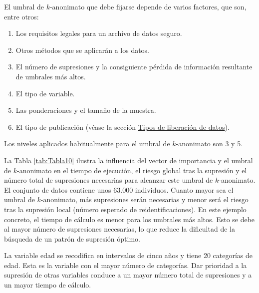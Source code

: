 \documentclass[]{book}
\providecommand{\tightlist}{%
  \setlength{\itemsep}{0pt}\setlength{\parskip}{0pt}}
\theoremstyle{definition}
\theoremstyle{definition}
\theoremstyle{definition}
\theoremstyle{definition}
\theoremstyle{remark}
\begin{document}
El umbral de \(k\)-anonimato que debe fijarse depende de varios factores, que son, entre otros:

\begin{enumerate}
\def\labelenumi{\arabic{enumi}.}
\tightlist
\item
  Los requisitos legales para un archivo de datos seguro.
\item
  Otros métodos que se aplicarán a los datos.
\item
  El número de supresiones y la consiguiente pérdida de información resultante de umbrales más altos.
\item
  El tipo de variable.
\item
  Las ponderaciones y el tamaño de la muestra.
\item
  El tipo de publicación (véase la sección \protect\hyperlink{tipos-de-liberaciuxf3n-de-datos}{Tipos de liberación de datos}).
\end{enumerate}

Los niveles aplicados habitualmente para el umbral de \(k\)-anonimato son 3 y 5.

La Tabla \ref{tab:Tabla10} ilustra la influencia del vector de importancia y el umbral de \(k\)-anonimato en el tiempo de ejecución, el riesgo global tras la supresión y el número total de supresiones necesarias para alcanzar este umbral de \(k\)-anonimato. El conjunto de datos contiene unos 63.000 individuos. Cuanto mayor sea el umbral de \(k\)-anonimato, más supresiones serán necesarias y menor será el riesgo tras la supresión local (número esperado de reidentificaciones). En este ejemplo concreto, el tiempo de cálculo es menor para los umbrales más altos. Esto se debe al mayor número de supresiones necesarias, lo que reduce la dificultad de la búsqueda de un patrón de supresión óptimo.

La variable edad se recodifica en intervalos de cinco años y tiene 20 categorías de edad. Esta es la variable con el mayor número de categorías. Dar prioridad a la supresión de otras variables conduce a un mayor número total de supresiones y a un mayor tiempo de cálculo.
\end{document}
